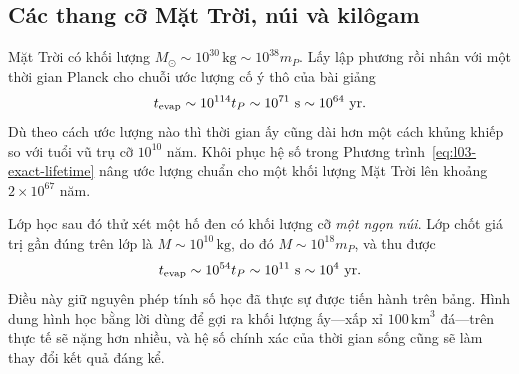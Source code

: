 \subsection{Các thang cỡ Mặt Trời, núi và kilôgam}

Mặt Trời có khối lượng \(M_\odot\sim10^{30}\,\mathrm{kg}\sim10^{38}m_P\). Lấy lập phương rồi nhân với một thời gian Planck cho chuỗi ước lượng cố ý thô của bài giảng
\begin{equation}
t_{\mathrm{evap}}\sim10^{114}t_P
\sim10^{71}\ {\rm s}
\sim10^{64}\ {\rm yr}.
\end{equation}
Dù theo cách ước lượng nào thì thời gian ấy cũng dài hơn một cách khủng khiếp so với tuổi vũ trụ cỡ \(10^{10}\) năm. Khôi phục hệ số trong Phương trình~\eqref{eq:l03-exact-lifetime} nâng ước lượng chuẩn cho một khối lượng Mặt Trời lên khoảng \(2\times10^{67}\) năm.

Lớp học sau đó thử xét một hố đen có khối lượng cỡ \emph{một ngọn núi}. Lớp chốt giá trị gần đúng trên lớp là \(M\sim10^{10}\,\mathrm{kg}\), do đó \(M\sim10^{18}m_P\), và thu được
\begin{equation}
t_{\mathrm{evap}}\sim10^{54}t_P
\sim10^{11}\ {\rm s}
\sim10^4\ {\rm yr}.
\end{equation}
Điều này giữ nguyên phép tính số học đã thực sự được tiến hành trên bảng. Hình dung hình học bằng lời dùng để gợi ra khối lượng ấy---xấp xỉ \(100\,\mathrm{km}^3\) đá---trên thực tế sẽ nặng hơn nhiều, và hệ số chính xác của thời gian sống cũng sẽ làm thay đổi kết quả đáng kể.

\begin{classroomqa}
\end{classroomqa}

